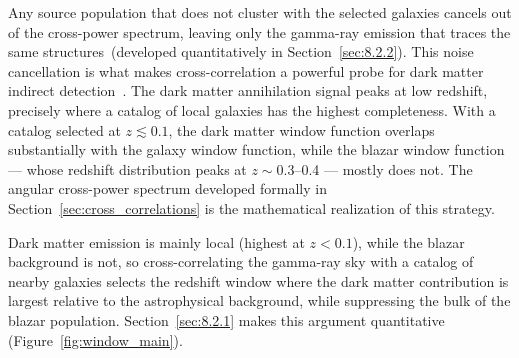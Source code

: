 Any source population that does not cluster with the selected galaxies cancels out of the cross-power spectrum, leaving only the gamma-ray emission that traces the same structures~(developed quantitatively in Section~\ref{sec:8.2.2}).
This noise cancellation is what makes cross-correlation a powerful probe for dark matter indirect detection~\cite{Fornengo:2013rga,Camera:2012cj}.
The dark matter annihilation signal peaks at low redshift, precisely where a catalog of local galaxies has the highest completeness.
With a catalog selected at $z \lesssim 0.1$, the dark matter window function overlaps substantially with the galaxy window function, while the blazar window function --- whose redshift distribution peaks at $z \sim 0.3$--0.4 --- mostly does not.
The angular cross-power spectrum developed formally in Section~\ref{sec:cross_correlations} is the mathematical realization of this strategy.

Dark matter emission is mainly local (highest at $z < 0.1$), while the blazar background is not, so cross-correlating the gamma-ray sky with a catalog of nearby galaxies selects the redshift window where the dark matter contribution is largest relative to the astrophysical background, while suppressing the bulk of the blazar population. Section~\ref{sec:8.2.1} makes this argument quantitative (Figure~\ref{fig:window_main}).
